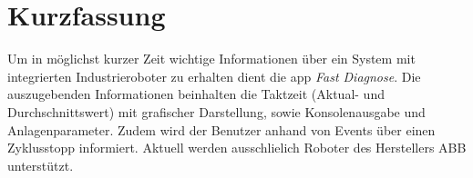 \chapter*{Kurzfassung}
\thispagestyle{empty}
Um in möglichst kurzer Zeit wichtige Informationen über ein System mit 
integrierten Industrieroboter zu erhalten dient die \gls{app} \textit{Fast 
Diagnose}. Die auszugebenden Informationen beinhalten die Taktzeit (Aktual- und 
Durchschnittswert) mit grafischer Darstellung, sowie Konsolenausgabe und 
Anlagenparameter. Zudem wird der Benutzer anhand von Events über einen 
Zyklusstopp informiert. Aktuell werden ausschlielich Roboter des Herstellers 
ABB unterstützt.